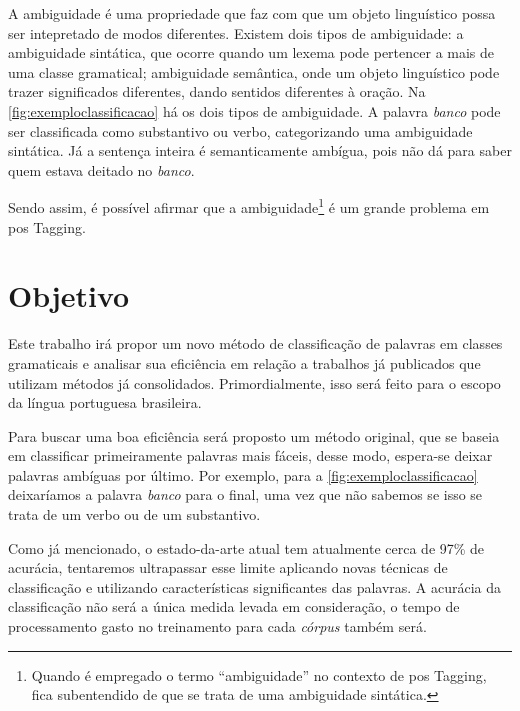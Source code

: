 A ambiguidade é uma propriedade que faz com que um objeto linguístico possa ser intepretado de modos diferentes. Existem dois tipos de ambiguidade: a ambiguidade sintática, que ocorre quando um lexema pode pertencer a mais de uma classe gramatical; ambiguidade semântica, onde um objeto linguístico pode trazer significados diferentes, dando sentidos diferentes à oração. Na \autoref{fig:exemploclassificacao} há os dois tipos de ambiguidade. A palavra \textit{banco} pode ser classificada como substantivo ou verbo, categorizando uma ambiguidade sintática. Já a sentença inteira é semanticamente ambígua, pois não dá para saber quem estava deitado no \textit{banco}.

Sendo assim, é possível afirmar que a ambiguidade\footnote{Quando é empregado o termo ``ambiguidade'' no contexto de \ac{pos} Tagging, fica subentendido de que se trata de uma ambiguidade sintática.} é um grande problema em \ac{pos} Tagging. 






\section{Objetivo}\label{sec:objetivo}

Este trabalho irá propor um novo método de classificação de palavras em classes gramaticais e analisar sua eficiência em relação a trabalhos já publicados que utilizam métodos já consolidados. Primordialmente, isso será feito para o escopo da língua portuguesa brasileira. 

Para buscar uma boa eficiência será proposto um método original, que se baseia em classificar primeiramente palavras mais fáceis, desse modo, espera-se deixar palavras ambíguas por último. Por exemplo, para a \autoref{fig:exemploclassificacao} deixaríamos a palavra \textit{banco} para o final, uma vez que não sabemos se isso se trata de um verbo ou de um substantivo.  

Como já mencionado, o estado-da-arte atual tem atualmente cerca de 97\% de acurácia, tentaremos ultrapassar esse limite aplicando novas técnicas de classificação e utilizando características significantes das palavras. A acurácia da classificação não será a única medida levada em consideração, o tempo de processamento gasto no treinamento para cada \textit{córpus} também será.

